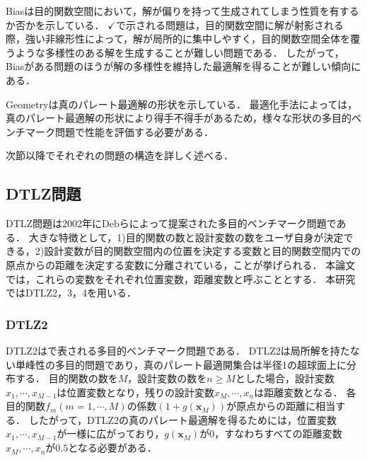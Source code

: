 \documentclass[../main/main]{subfiles}
\begin{document}
Biasは目的関数空間において，解が偏りを持って生成されてしまう性質を有するか否かを示している．
$\checkmark$で示される問題は，目的関数空間に解が射影される際，強い非線形性によって，解が局所的に集中しやすく，目的関数空間全体を覆うような多様性のある解を生成することが難しい問題である．
したがって，Biasがある問題のほうが解の多様性を維持した最適解を得ることが難しい傾向にある．

Geometryは真のパレート最適解の形状を示している．
最適化手法によっては，真のパレート最適解の形状により得手不得手があるため，様々な形状の多目的ベンチマーク問題で性能を評価する必要がある．

次節以降でそれぞれの問題の構造を詳しく述べる．

\subsection{DTLZ問題}
DTLZ問題\cite{}は2002年にDebらによって提案された多目的ベンチマーク問題である．
大きな特徴として，1)目的関数の数と設計変数の数をユーザ自身が決定できる，2)設計変数が目的関数空間内の位置を決定する変数と目的関数空間内での原点からの距離を決定する変数に分離されている，ことが挙げられる．
本論文では，これらの変数をそれぞれ位置変数，距離変数と呼ぶこととする．
本研究ではDTLZ2，3，4を用いる．

\subsubsection{DTLZ2}
DTLZ2はで表される多目的ベンチマーク問題である．
DTLZ2は局所解を持たない単峰性の多目的問題であり，真のパレート最適開集合は半径1の超球面上に分布する．
目的関数の数を$M$，設計変数の数を$n \geq M$とした場合，設計変数$x_1,\cdots,x_{M-1}$は位置変数となり，残りの設計変数$x_M,\cdots,x_n$は距離変数となる．
各目的関数$f_m(m=1, \cdots ,M)$の係数$(1+g(\bm{x}_M))$が原点からの距離に相当する．
したがって，DTLZ2の真のパレート最適解を得るためには，位置変数$x_1,\cdots,x_{M-1}$が一様に広がっており，$g(\bm{x}_M)$が$0$，すなわちすべての距離変数$x_M,\cdots,x_n$が$0.5$となる必要がある．
\end{document}
